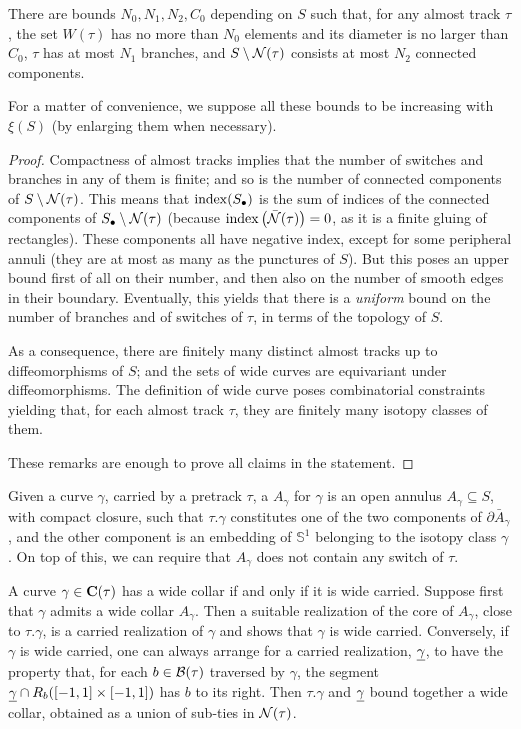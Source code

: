 \begin{lemma}\label{lem:vertexsetbounds}
There are bounds $N_0, N_1, N_2, C_0$ depending on $S$ such that, for any almost track $\tau$, the set $W(\tau)$ has no more than $N_0$ elements and its diameter is no larger than $C_0$, $\tau$ has at most $N_1$ branches, and $S\setminus{\mathcal N}(\tau)$ consists at most $N_2$ connected components.

For a matter of convenience, we suppose all these bounds to be increasing with $\xi(S)$ (by enlarging them when necessary).
\end{lemma}
\begin{proof}
Compactness of almost tracks implies that the number of switches and branches in any of them is finite; and so is the number of connected components of $S \setminus {\mathcal N}(\tau)$. This means that $\mathrm{index}(S_\bullet)$ is the sum of indices of the connected components of $S_\bullet\setminus {\mathcal N}(\tau)$ (because $\mathrm{index}\left(\bar{{\mathcal N}}(\tau)\right)=0$, as it is a finite gluing of rectangles). These components all have negative index, except for some peripheral annuli (they are at most as many as the punctures of $S$). But this poses an upper bound first of all on their number, and then also on the number of smooth edges in their boundary. Eventually, this yields that there is a \emph{uniform} bound on the number of branches and of switches of $\tau$, in terms of the topology of $S$.

As a consequence, there are finitely many distinct almost tracks up to diffeomorphisms of $S$; and the sets of wide curves are equivariant under diffeomorphisms. The definition of wide curve poses combinatorial constraints yielding that, for each almost track $\tau$, they are finitely many isotopy classes of them.

These remarks are enough to prove all claims in the statement.
\end{proof}

Given a curve $\gamma$, carried by a pretrack $\tau$, a  $A_\gamma$ for $\gamma$ is an open annulus $A_\gamma\subseteq S$, with compact closure, such that $\tau.\gamma$ constitutes one of the two components of $\partial\bar A_\gamma$, and the other component is an embedding of $\mathbb S^1$ belonging to the isotopy class $\gamma$. On top of this, we can require that $A_\gamma$ does not contain any switch of $\tau$.

A curve $\gamma\in\mathbf C(\tau)$ has a wide collar if and only if it is wide carried. Suppose first that $\gamma$ admits a wide collar $A_\gamma$. Then a suitable realization of the core of $A_\gamma$, close to $\tau.\gamma$, is a carried realization of $\gamma$ and shows that $\gamma$ is wide carried. Conversely, if $\gamma$ is wide carried, one can always arrange for a carried realization, $\underline{\gamma}$, to have the property that, for each $b\in\mathcal B(\tau)$ traversed by $\gamma$, the segment $\underline{\gamma}\cap R_b([-1,1]\times[-1,1])$ has $b$ to its right. Then $\tau.\gamma$ and $\underline{\gamma}$ bound together a wide collar, obtained as a union of sub-ties in ${\mathcal N}(\tau)$. 

